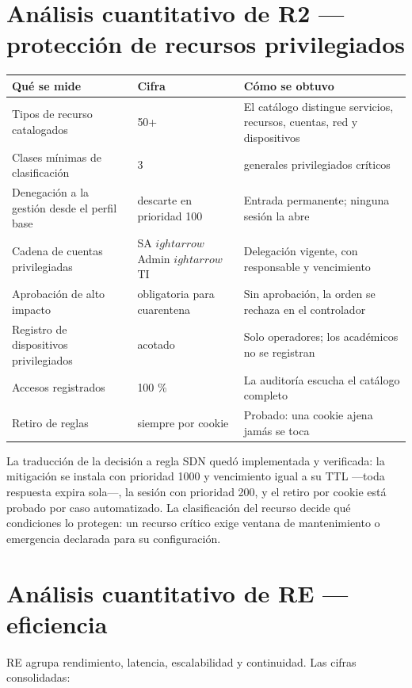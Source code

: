 \documentclass[11pt,a4paper]{article}
\begin{document}
\section{Análisis cuantitativo de R2 --- protección de recursos privilegiados}

\begin{longtable}{p{6.4cm}p{2.2cm}p{5.4cm}}
\toprule
\textbf{Qué se mide} & \textbf{Cifra} & \textbf{Cómo se obtuvo}\\
\midrule
Tipos de recurso catalogados & 50+ & El catálogo distingue servicios, recursos, cuentas, red y dispositivos\\
Clases mínimas de clasificación & 3 & generales \textperiodcentered{} privilegiados \textperiodcentered{} críticos\\
Denegación a la gestión desde el perfil base & descarte en prioridad 100 & Entrada permanente; ninguna sesión la abre\\
Cadena de cuentas privilegiadas & SA $
ightarrow$ Admin $
ightarrow$ TI & Delegación vigente, con responsable y vencimiento\\
Aprobación de alto impacto & obligatoria para cuarentena & Sin aprobación, la orden se rechaza en el controlador\\
Registro de dispositivos privilegiados & acotado & Solo operadores; los académicos no se registran\\
Accesos registrados & 100 \% & La auditoría escucha el catálogo completo\\
Retiro de reglas & siempre por cookie & Probado: una cookie ajena jamás se toca\\
\bottomrule
\end{longtable}

La traducción de la decisión a regla SDN quedó implementada y verificada: la mitigación se instala con prioridad 1000 y vencimiento igual a su TTL ---toda respuesta expira sola---, la sesión con prioridad 200, y el retiro por cookie está probado por caso automatizado. La clasificación del recurso decide qué condiciones lo protegen: un recurso crítico exige ventana de mantenimiento o emergencia declarada para su configuración.

\section{Análisis cuantitativo de RE --- eficiencia}

RE agrupa rendimiento, latencia, escalabilidad y continuidad. Las cifras consolidadas:
\end{document}
